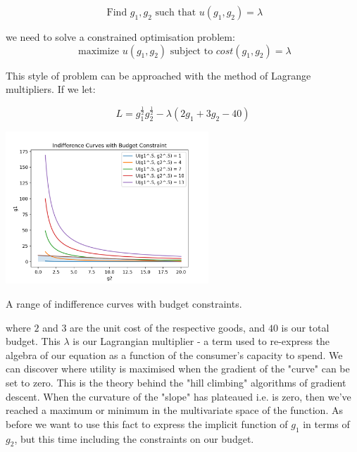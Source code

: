 \documentclass{tufte-handout}
\begin{document}
$$ \text{ Find } g_{1}, g_{2} \text{ such that } u(g_{1}, g_{2}) = \lambda $$

\noindent we need to solve a constrained optimisation problem: 
$$ \text{ maximize } u(g_{1}, g_{2})  \text{ subject to } cost(g_{1}, g_{2}) =  \lambda$$

\noindent This style of problem can be approached with the method of Lagrange multipliers. If we let:

$$ L = g_{1}^{\frac{1}{2}}g_{2}^{\frac{1}{2}} - \lambda(2g_{1} + 3g_{2} - 40) $$


\begin{marginfigure}
\includegraphics[width=3in, height=5.in]{Plots/indifference_curves_budget.png}
\caption{A range of indifference curves with budget constraints.}
\end{marginfigure}

\noindent where $2$ and $3$ are the unit cost of the respective goods, and $40$ is our total budget. This $\lambda$ is our Lagrangian multiplier - a term used to re-express the algebra of our equation as a function of the consumer's capacity to spend. We can discover where utility is maximised when the gradient of the "curve" can be set to zero. This is the theory behind the "hill climbing" algorithms of gradient descent. When the curvature of the "slope" has plateaued i.e. is zero, then we've reached a maximum or minimum in the multivariate space of the function. As before we want to use this fact to express the implicit function of $g_{1}$ in terms of $g_{2}$, but this time including the constraints on our budget.
\end{document}
